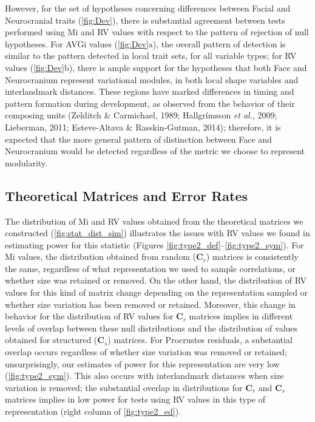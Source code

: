 \documentclass[12pt,]{article}
\begin{document}
However, for the set of hypotheses concerning differences between Facial
and Neurocranial traits (\autoref{fig:Dev}), there is substantial
agreement between tests performed using Mi and RV values with respect to
the pattern of rejection of null hypotheses. For AVGi values
(\autoref{fig:Dev}a), the overall pattern of detection is similar to the
pattern detected in local trait sets, for all variable types; for RV
values (\autoref{fig:Dev}b), there is ample support for the hypotheses
that both Face and Neurocranium represent variational modules, in both
local shape variables and interlandmark distances. These regions have
marked differences in timing and pattern formation during development,
as observed from the behavior of their composing units (Zelditch \&
Carmichael, 1989; Hallgrímsson \emph{et al.}, 2009; Lieberman, 2011;
Esteve-Altava \& Rasskin-Gutman, 2014); therefore, it is expected that
the more general pattern of distinction between Face and Neurocranium
would be detected regardless of the metric we choose to represent
modularity.

\subsection{Theoretical Matrices and Error
Rates}\label{theoretical-matrices-and-error-rates}

The distribution of Mi and RV values obtained from the theoretical
matrices we constructed (\autoref{fig:stat_dist_sim}) illustrates the
issues with RV values we found in estimating power for this statistic
(Figures \ref{fig:type2_def}--\ref{fig:type2_sym}). For Mi values, the
distribution obtained from random ($\mathbf{C}_r$) matrices is
consistently the same, regardless of what representation we used to
sample correlations, or whether size was retained or removed. On the
other hand, the distribution of RV values for this kind of matrix change
depending on the representation sampled or whether size variation has
been removed or retained. Moreover, this change in behavior for the
distribution of RV values for $\mathbf{C}_r$ matrices implies in
different levels of overlap between these null distributions and the
distribution of values obtained for structured ($\mathbf{C}_s$)
matrices. For Procrustes residuals, a substantial overlap occurs
regardless of whether size variation was removed or retained;
unsurprisingly, our estimates of power for this representation are very
low (\autoref{fig:type2_sym}). This also occurs with interlandmark
distances when size variation is removed; the substantial overlap in
distributions for $\mathbf{C}_r$ and $\mathbf{C}_s$ matrices implies in
low power for tests using RV values in this type of representation
(right column of \autoref{fig:type2_ed}).
\end{document}
